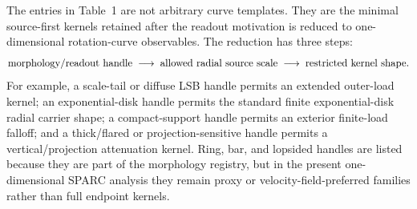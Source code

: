 \documentclass[11pt]{article}
\begin{document}
The entries in Table~1 are not arbitrary curve templates.  They are the
minimal source-first kernels retained after the readout motivation is reduced
to one-dimensional rotation-curve observables.  The reduction has three steps:
\[
\hbox{morphology/readout handle}
\;\longrightarrow\;
\hbox{allowed radial source scale}
\;\longrightarrow\;
\hbox{restricted kernel shape}.
\]
For example, a scale-tail or diffuse LSB handle permits an extended outer-load
kernel; an exponential-disk handle permits the standard finite exponential-disk
radial carrier shape; a compact-support handle permits an exterior finite-load
falloff; and a thick/flared or projection-sensitive handle permits a
vertical/projection attenuation kernel.  Ring, bar, and lopsided handles are
listed because they are part of the morphology registry, but in the present
one-dimensional SPARC analysis they remain proxy or velocity-field-preferred
families rather than full endpoint kernels.

\begin{table}[H]
\centering
\caption{Current sample coverage of the source-native readout families.  Counts
refer to the 175-row SPARC preflight label table.  The examples are illustrative,
not a complete list.}
\label{tab:family-coverage}
\small
{}
\end{table}
\end{document}
